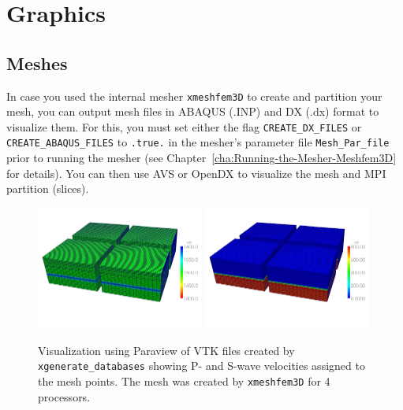 \chapter{Graphics}

\section{Meshes}\label{sec:Mesh-graphics}

In case you used the internal mesher \texttt{xmeshfem3D} to create
and partition your mesh, you can output mesh files in ABAQUS (.INP)
and DX (.dx) format to visualize them. For this, you must set either
the flag \texttt{CREATE\_DX\_FILES} or \texttt{CREATE\_ABAQUS\_FILES}
to \texttt{.true.} in the mesher's parameter file \texttt{Mesh\_Par\_file}
prior to running the mesher (see Chapter~\ref{cha:Running-the-Mesher-Meshfem3D}
for details). You can then use AVS 
or OpenDX  to visualize the mesh
and MPI partition (slices).

\begin{figure}[htbp]
\noindent \begin{centering}
\includegraphics[width=0.49\textwidth]{figures/vtk_mesh_vp.jpg} 
\includegraphics[width=0.49\textwidth]{figures/vtk_mesh_vs.jpg}
\par\end{centering}

\caption{Visualization using Paraview of VTK files created by \texttt{xgenerate\_databases}
showing P- and S-wave velocities assigned to the mesh points. The
mesh was created by \texttt{xmeshfem3D} for 4 processors.}


\label{fig:vtk.mesh}
\end{figure}


